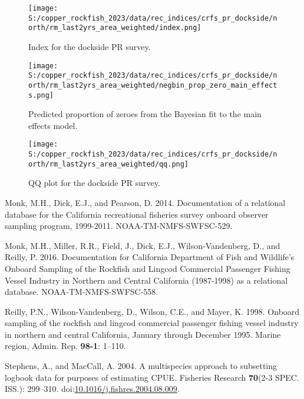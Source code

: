 \documentclass[11pt,
  english,
  letterpaper,
]{article}
\newlength{\cslhangindent}
\newenvironment{CSLReferences}[2] %
 {%
  \setlength{\parindent}{0pt}
  \ifodd #1 \everypar{\setlength{\hangindent}{\cslhangindent}}\ignorespaces\fi
  \ifnum #2 > 0
  \setlength{\parskip}{#2\baselineskip}
  \fi
 }%
 {}
\begin{document}
\newpage

\begin{figure}
\centering
\texttt{[image: S:/copper\_rockfish\_2023/data/rec\_indices/crfs\_pr\_dockside/north/rm\_last2yrs\_area\_weighted/index.png]}
\caption{Index for the dockside PR survey.\label{fig:pr-index}}
\end{figure}

\newpage

\begin{figure}
\centering
\texttt{[image: S:/copper\_rockfish\_2023/data/rec\_indices/crfs\_pr\_dockside/north/rm\_last2yrs\_area\_weighted/negbin\_prop\_zero\_main\_effects.png]}
\caption{Predicted proportion of zeroes from the Bayesian fit to the main effects model.\label{fig:pr-prop-zero}}
\end{figure}

\newpage

\begin{figure}
\centering
\texttt{[image: S:/copper\_rockfish\_2023/data/rec\_indices/crfs\_pr\_dockside/north/rm\_last2yrs\_area\_weighted/qq.png]}
\caption{QQ plot for the dockside PR survey.\label{fig:pr-qq}}
\end{figure}

\newpage

\hypertarget{refs}{}
\begin{CSLReferences}{1}{0}
\leavevmode{}%
Monk, M.H., Dick, E.J., and Pearson, D. 2014. Documentation of a relational database for the {California} recreational fisheries survey onboard observer sampling program, 1999-2011. NOAA-TM-NMFS-SWFSC-529.

\leavevmode{}%
Monk, M.H., Miller, R.R., Field, J., Dick, E.J., Wilson-Vandenberg, D., and Reilly, P. 2016. Documentation for {California} {Department} of {Fish} and {Wildlife}'s {Onboard} {Sampling} of the {Rockfish} and {Lingcod} {Commercial} {Passenger} {Fishing} {Vessel} {Industry} in {Northern} and {Central} {California} (1987-1998) as a relational database. NOAA-TM-NMFS-SWFSC-558.

\leavevmode{}%
Reilly, P.N., Wilson-Vandenberg, D., Wilson, C.E., and Mayer, K. 1998. Onboard sampling of the rockfish and lingcod commercial passenger fishing vessel industry in northern and central {California}, {January} through {December} 1995. Marine region, Admin. Rep. \textbf{98-1}: 1--110.

\leavevmode{}%
Stephens, A., and MacCall, A. 2004. A multispecies approach to subsetting logbook data for purposes of estimating {CPUE}. Fisheries Research \textbf{70}(2-3 SPEC. ISS.): 299--310. doi:\href{https://doi.org/10.1016/j.fishres.2004.08.009}{10.1016/j.fishres.2004.08.009}.

\end{CSLReferences}
\end{document}
